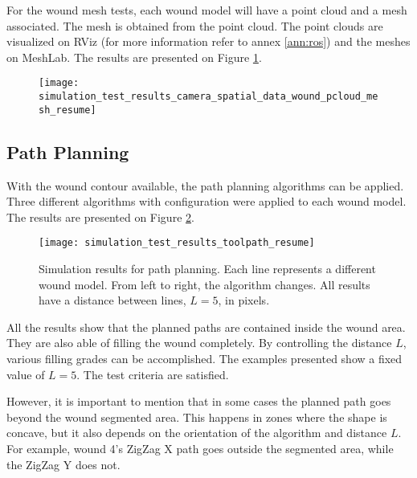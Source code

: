 For the wound mesh tests, each wound model will have a point cloud and a mesh associated. The mesh is obtained from the point cloud. The point clouds are visualized on RViz (for more information refer to annex \ref{ann:ros}) and the meshes on MeshLab. The results are presented on Figure \ref{fig:simulation_test_results_camera_spatial_data_wound_pcloud_mesh_resume}.

\begin{figure}[htbp]
	\centering
	\texttt{[image: simulation\_test\_results\_camera\_spatial\_data\_wound\_pcloud\_mesh\_resume]}
	\caption{}
	\label{fig:simulation_test_results_camera_spatial_data_wound_pcloud_mesh_resume}
\end{figure}



\subsection{Path Planning}
\label{subsec:simulated_system_results_path_planning}

With the wound contour available, the path planning algorithms can be applied. Three different algorithms with configuration were applied to each wound model. The results are presented on Figure \ref{fig:simulation_test_results_toolpath_resume}.\\

\begin{figure}[htbp]
	\centering
	\texttt{[image: simulation\_test\_results\_toolpath\_resume]}
	\caption{Simulation results for path planning. Each line represents a different wound model. From left to right, the algorithm changes. All results have a distance between lines, $L = 5$, in pixels.}
	\label{fig:simulation_test_results_toolpath_resume}
\end{figure}

All the results show that the planned paths are contained inside the wound area. They are also able of filling the wound completely. By controlling the distance $L$, various filling grades can be accomplished. The examples presented show a fixed value of $L = 5$. The test criteria are satisfied.

However, it is important to mention that in some cases the planned path goes beyond the wound segmented area. This happens in zones where the shape is concave, but it also depends on the orientation of the algorithm and distance $L$. For example, wound 4's ZigZag X path goes outside the segmented area, while the ZigZag Y does not.\\

